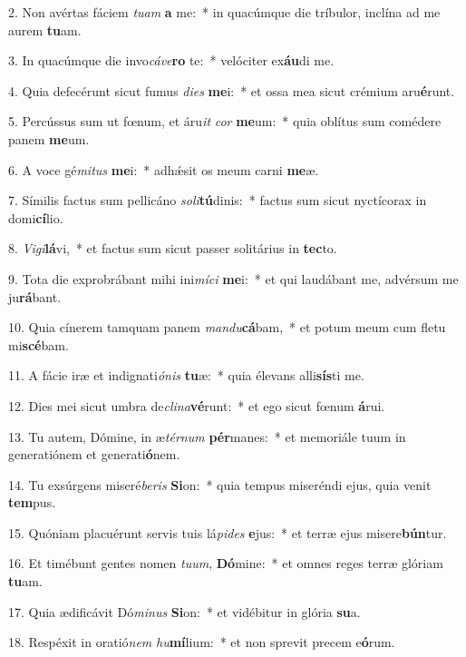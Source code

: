 2. Non avértas fáciem \textit{tu}\textit{am} \textbf{a} me:~*  in quacúmque die tríbulor, inclína ad me aurem \textbf{tu}am.\

3. In quacúmque die invo\textit{cá}\textit{ve}\textbf{ro} te:~*  velóciter ex\textbf{áu}di me.\

4. Quia defecérunt sicut fumus \textit{di}\textit{es} \textbf{me}i:~*  et ossa mea sicut crémium aru\textbf{é}runt.\

5. Percússus sum ut fœnum, et áru\textit{it} \textit{cor} \textbf{me}um:~*  quia oblítus sum comédere panem \textbf{me}um.\

6. A voce gé\textit{mi}\textit{tus} \textbf{me}i:~*  adhǽsit os meum carni \textbf{me}æ.\

7. Símilis factus sum pellicáno \textit{so}\textit{li}\textbf{tú}dinis:~*  factus sum sicut nyctícorax in domi\textbf{cí}lio.\

8. \textit{Vi}\textit{gi}\textbf{lá}vi,~*  et factus sum sicut passer solitárius in \textbf{tec}to.\

9. Tota die exprobrábant mihi ini\textit{mí}\textit{ci} \textbf{me}i:~*  et qui laudábant me, advérsum me ju\textbf{rá}bant.\

10. Quia cínerem tamquam panem \textit{man}\textit{du}\textbf{cá}bam,~*  et potum meum cum fletu mi\textbf{scé}bam.\

11. A fácie iræ et indignati\textit{ó}\textit{nis} \textbf{tu}æ:~*  quia élevans alli\textbf{sís}ti me.\

12. Dies mei sicut umbra de\textit{cli}\textit{na}\textbf{vé}runt:~*  et ego sicut fœnum \textbf{á}rui.\

13. Tu autem, Dómine, in æ\textit{tér}\textit{num} \textbf{pér}manes:~*  et memoriále tuum in generatiónem et generati\textbf{ó}nem.\

14. Tu exsúrgens miseré\textit{be}\textit{ris} \textbf{Si}on:~*  quia tempus miseréndi ejus, quia venit \textbf{tem}pus.\

15. Quóniam placuérunt servis tuis lá\textit{pi}\textit{des} \textbf{e}jus:~*  et terræ ejus misere\textbf{bún}tur.\

16. Et timébunt gentes nomen \textit{tu}\textit{um}, \textbf{Dó}mine:~*  et omnes reges terræ glóriam \textbf{tu}am.\

17. Quia ædificávit Dó\textit{mi}\textit{nus} \textbf{Si}on:~*  et vidébitur in glória \textbf{su}a.\

18. Respéxit in oratió\textit{nem} \textit{hu}\textbf{mí}lium:~*  et non sprevit precem e\textbf{ó}rum.\

